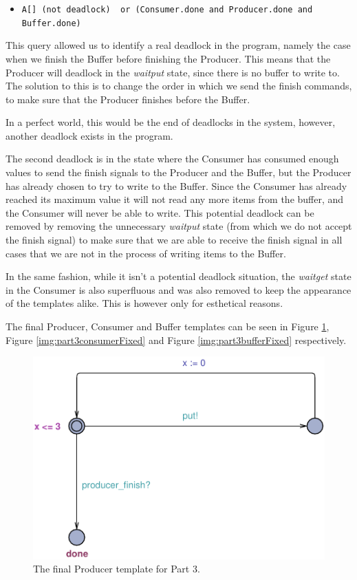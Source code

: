 \documentclass[a4paper,10pt]{article}
\newcommand{\query}[1]{\lstinline{#1}}
\begin{document}
\begin{itemize}
  \item[] \query{A[] (not deadlock)  or (Consumer.done and Producer.done and Buffer.done)}
\end{itemize}

This query allowed us to identify a real deadlock in the program, namely the case when we finish the Buffer before finishing the Producer. This means that the Producer will deadlock in the \emph{waitput} state, since there is no buffer to write to. The solution to this is to change the order in which we send the finish commands, to make sure that the Producer finishes before the Buffer.

In a perfect world, this would be the end of deadlocks in the system, however, another deadlock exists in the program.

The second deadlock is in the state where the Consumer has consumed enough values to send the finish signals to the Producer and the Buffer, but the Producer has already chosen to try to write to the Buffer. Since the Consumer has already reached its maximum value it will not read any more items from the buffer, and the Consumer will never be able to write. This potential deadlock can be removed by removing the unnecessary \emph{waitput} state (from which we do not accept the finish signal) to make sure that we are able to receive the finish signal in all cases that we are not in the process of writing items to the Buffer.

In the same fashion, while it isn't a potential deadlock situation, the \emph{waitget} state in the Consumer is also superfluous and was also removed to keep the appearance of the templates alike. This is however only for esthetical reasons.

The final Producer, Consumer and Buffer templates can be seen in Figure \ref{img:part3producerFixed}, Figure \ref{img:part3consumerFixed} and Figure \ref{img:part3bufferFixed} respectively.

\begin{figure}[h]
  \center
  \includegraphics{Part3ProducerFixed.pdf}
  \caption{The final Producer template for Part 3.}
  \label{img:part3producerFixed}
\end{figure}
\end{document}
